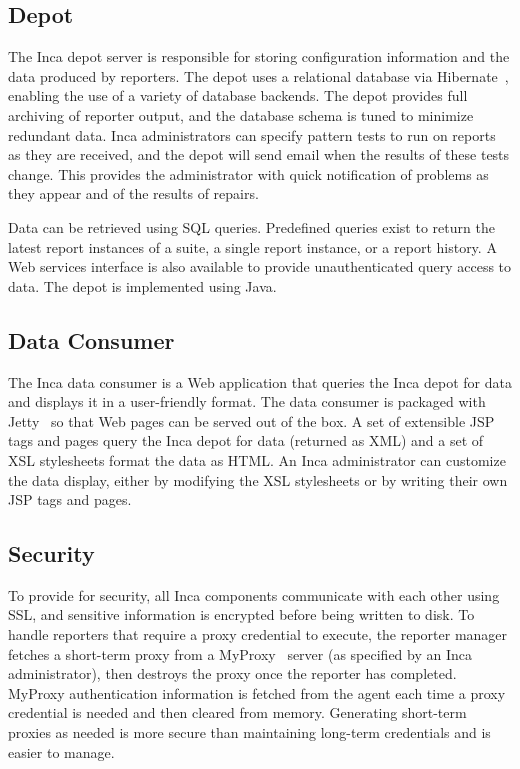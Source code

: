 \documentclass{sig-alternate}
\begin{document}
\subsection{Depot}

The Inca depot server is responsible for storing configuration information and
the data produced by reporters. The depot uses a relational database via
Hibernate~\cite{hibernate}, enabling the use of a variety of database backends.
The depot provides full archiving of reporter output, and the database schema is
tuned to minimize redundant data.  Inca administrators can specify pattern
tests to run on reports as they are received, and the depot will send email
when the results of these tests change.  This provides the administrator
with quick notification of problems as they appear and of the results of
repairs.

Data can be retrieved using SQL queries. Predefined queries exist to return the
latest report instances of a suite, a single report instance, or a report
history.  A Web services interface is also available to provide
unauthenticated query access to data.  The depot is implemented using Java.

\subsection{Data Consumer}

The Inca data consumer is a Web application that queries the Inca depot for
data and displays it in a user-friendly format.  The data consumer is packaged
with Jetty~\cite{jetty} so that Web pages can be served out of the box.  A set
of extensible JSP tags and pages query the Inca depot for data (returned as
XML)
and a set of XSL stylesheets format the data as HTML.  An Inca administrator
can customize the data display, either by modifying the XSL stylesheets or by
writing their own JSP tags and pages.

\subsection{Security}
\label{security}

To provide for security, all Inca components communicate with each other using
SSL, and sensitive information is encrypted before being written to disk.  To
handle reporters that
require a proxy credential to execute, the reporter manager fetches a
short-term proxy from a MyProxy~\cite{myproxy} server (as specified by an Inca
administrator), then destroys the proxy once the reporter has completed.
MyProxy authentication information is fetched from the agent each time a proxy
credential is needed and then cleared from memory.  Generating short-term 
proxies as needed is more secure than maintaining long-term
credentials and is easier to manage.
\end{document}
